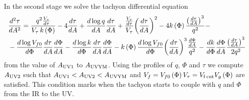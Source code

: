 \documentclass[a4paper,12pt]{article}
\begin{document}
In the second stage we solve the tachyon differential equation
\begin{align}
&\frac{d^2\tau}{d A^2} =  \frac{q^2 \frac{V_\tau}{d\tau}}{ V_{\tau} \, k\left(\Phi\right)} - 4 \frac{d \tau}{dA} + \frac{d \log q}{dA} \frac{d\tau}{dA} + \frac{\frac{V_\tau}{d\tau}}{V_{\tau}} {\left(\frac{d\tau}{dA}\right)}^2 - 4 k\left(\Phi\right) \frac{{\left( \frac{d\tau}{dA}\right)}^3}{q^2} - \\ \notag
& - \frac{d \log V_{f0}}{d\Phi} \frac{d\tau}{dA} \frac{d\Phi}{dA} - \frac{d \log k}{d\Phi} \frac{d\tau}{dA} \frac{d\Phi}{dA} - k\left(\Phi\right) \frac{d \log V_{f0}}{d\Phi} {\left(\frac{d\tau}{dA}\right)}^3 \frac{\frac{d\Phi}{dA}}{q^2} - \frac{d k}{d\Phi} \frac{d\Phi}{dA} \frac{{\left(\frac{d\tau}{dA}\right)}^3}{2 q^2}
\label{eq: tau YM 2}
\end{align}
from the value of $A_{\rm{UV1}}$ to $A_{\rm{UVYM}}$. Using the profiles of $q$, $\Phi$ and $\tau$ we compute $A_{\rm{UV2}}$ such that $A_{\rm{UV1}} < A_{\rm{UV2}} < A_{\rm{UVYM}}$ and $V_{f} = V_{f0}\left(\Phi\right) V_\tau = V_{\rm{f \, cut}} V_g \left(\Phi\right)$ are satisfied. This condition marks when the tachyon starts to couple with $q$ and $\Phi$ from the IR to the UV.
\end{document}
